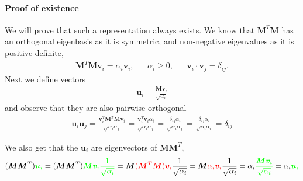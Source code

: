 \paragraph{Proof of existence}
We will prove that such a representation always exists.
We know that $\bm{M}^T \bm{M}$ has an orthogonal eigenbasis as it is symmetric, and non-negative eigenvalues as it is positive-definite,
\begin{align}
    \bm{M}^T \bm{M} \bm{v}_i = \alpha_i \bm{v}_i, && \alpha_i \geq 0, &&  \bm{v}_i \cdot \bm{v}_j = \delta_{ij}.
\end{align}
Next we define vectors 
\begin{align}
\bm{u}_i = \frac{\bm{Mv}_i}{\sqrt{\alpha_i}}
\end{align}
and observe that they are also pairwise orthogonal
\begin{align}
    \bm{u}_i \bm{u}_j = \frac{\bm{v}_i^T \bm{M}^T \bm{Mv}_i}{\sqrt{\alpha_i \alpha_j}} = \frac{\bm{v}_i^T \bm{v}_i \alpha_i}{{\sqrt{\alpha_i \alpha_j}}} = 
    \frac{\delta_{ij} \alpha_i}{{\sqrt{\alpha_i \alpha_j}}} = 
    \frac{\delta_{ij} \alpha_i}{{\sqrt{\alpha_i \alpha_i}}} = \delta_{ij}
\end{align}

We also get that the $\bm{u}_i$ are eigenvectors of $\bm{MM}^T$, 
\begin{align}
        (\bm{M}\bm{M}^T) {\color{green} \bm{u}_i}
    =(\bm{M}\bm{M}^T) {\color{green} \bm{Mv}_i \frac{1}{\sqrt{\alpha_i}}}
    =\bm{M}{\color{red} (\bm{M}^T \bm{M}) \bm{v}_i} \frac{1}{\sqrt{\alpha_i}} 
    = \bm{M} {\color{red} \alpha_i \bm{v}_i}  \frac{1}{\sqrt{\alpha_i}} 
    =  \alpha_i  {\color{green} \frac{\bm{M} \bm{v}_i}{\sqrt{\alpha_i}}} 
    = \alpha_i {\color{green} \bm{u}_i}
\end{align}


